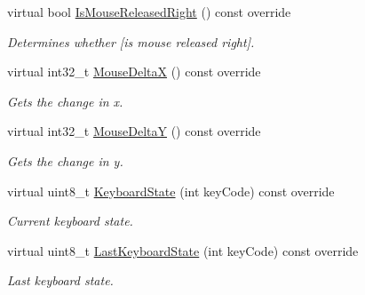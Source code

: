 \begin{DoxyCompactItemize}
virtual bool \hyperlink{class_g_l_input_handler_ae814e57ef88d5baf36fb96cb6d4cecdf}{Is\+Mouse\+Released\+Right} () const  override
\begin{DoxyCompactList}\small\item\em Determines whether \mbox{[}is mouse released right\mbox{]}. \end{DoxyCompactList}\item 
virtual int32\+\_\+t \hyperlink{class_g_l_input_handler_a454c80e8af6dd7e4308837bfb5666cf4}{Mouse\+DeltaX} () const  override
\begin{DoxyCompactList}\small\item\em Gets the change in x. \end{DoxyCompactList}\item 
virtual int32\+\_\+t \hyperlink{class_g_l_input_handler_a7036ef39cccc4f426e12d84ca86ca690}{Mouse\+DeltaY} () const  override
\begin{DoxyCompactList}\small\item\em Gets the change in y. \end{DoxyCompactList}\item 
virtual uint8\+\_\+t \hyperlink{class_g_l_input_handler_adac63dab79d1ea3a0a6b414de3a6e8d4}{Keyboard\+State} (int key\+Code) const  override
\begin{DoxyCompactList}\small\item\em Current keyboard state. \end{DoxyCompactList}\item 
virtual uint8\+\_\+t \hyperlink{class_g_l_input_handler_a3d5bbd3aa6712f73aeef12c1dbda410e}{Last\+Keyboard\+State} (int key\+Code) const  override
\begin{DoxyCompactList}\small\item\em Last keyboard state. \end{DoxyCompactList}\end{DoxyCompactItemize}
